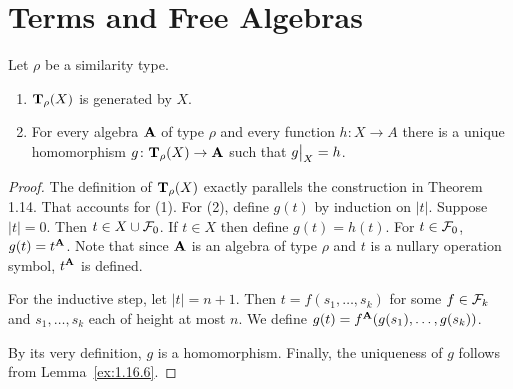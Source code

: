 \section{Terms and Free Algebras}


\begin{theorem} 
  \label{thm:4.21}
  Let $\rho$ be a similarity type.
  \begin{enumerate}
    \item $\mathbf{T}_\rho(X)$ is generated by $X$.
    \item For every algebra $\mathbf{A}$ of type $\rho$ and every function 
    $h\colon X \to A$ there is a unique homomorphism $g\colon \mathbf{T}_\rho(X) \to \mathbf{A}$ 
    such that $\restr{g}{X} = h$.
  \end{enumerate}
\end{theorem}
\begin{proof} The definition of $\mathbf{T}_\rho(X)$ exactly parallels the construction in 
Theorem 1.14. That accounts for (1). For (2), define $g(t)$ by induction on $|t|$. 
Suppose $|t| = 0$. Then $t \in X \cup \mathcal{F}_0$. If $t \in X$ then define 
$g(t) = h(t)$. For $t \in \mathcal{F}_0$, $g(t) = t^{\mathbf{A}}$. 
Note that since $\mathbf{A}$ is an algebra of type $\rho$ and $t$ is a nullary 
operation symbol, $t^{\mathbf{A}}$ is defined.

For the inductive step, let $|t| = n + 1$. Then $t = f(s_1, \dots, s_k)$ for some 
$f \in \mathcal{F}_k$ and $s_1, \dots, s_k$ each of height at most $n$. We define
$g(t) = f^{\mathbf{A}}(g(s_1), \dots, g(s_k))$.

By its very definition, $g$ is a homomorphism.
Finally, the uniqueness of $g$ follows from Lemma~\ref{ex:1.16.6}.
\end{proof}


